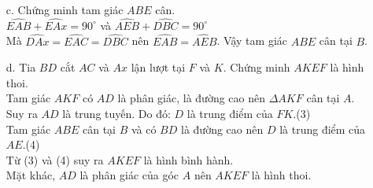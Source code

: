 \begin{ex}
{\begin{enumerate}
$\widehat{DBC}=\widehat{DAC}$ (cùng chắn cung $\wideparen{DC}$)\hfill(2)\\
Từ (1), (2) và $\widehat{DAx}=\widehat{DAC}$, suy ra $\widehat{ABD}=\widehat{DBC}$.
\item[c.] Chứng minh tam giác $ABE$ cân.\\
$\widehat{EAB}+\widehat{EAx}=90^\circ$ và $\widehat{AEB}+\widehat{DBC}=90^\circ$\\
Mà $\widehat{DAx}=\widehat{EAC}=\widehat{DBC}$ nên $\widehat{EAB}=\widehat{AEB}$. Vậy tam giác $ABE$ cân tại $B$.
\item[d.] Tia $BD$ cắt $AC$ và $Ax$ lận lượt tại $F$ và $K$. Chứng minh $AKEF$ là hình thoi.\\
Tam giác $AKF$ có $AD$ là phân giác, là đường cao nên $\Delta AKF$ cân tại $A$.\\
Suy ra $AD$ là trung tuyến. Do đó: $D$ là trung điểm của $FK$.\hfill(3)\\
Tam giác $ABE$ cân tại $B$ và có $BD$ là đường cao nên $D$ là trung điểm của $AE$.\hfill(4)\\
Từ (3) và (4) suy ra $AKEF$ là hình bình hành.\\
Mặt khác, $AD$ là phân giác của góc $A$ nên $AKEF$ là hình thoi.
\end{enumerate}
}
\end{ex}

